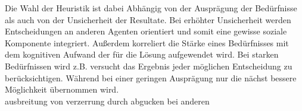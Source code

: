 Die Wahl der Heuristik ist dabei Abhängig von der Ausprägung der Bedürfnisse als auch von der Unsicherheit der Resultate.
Bei erhöhter Unsicherheit werden Entscheidungen an anderen Agenten orientiert und somit eine gewisse soziale Komponente integriert.
Außerdem korreliert die Stärke eines Bedürfnisses mit dem kognitiven Aufwand der für die Lösung aufgewendet wird.
Bei starken Bedürfnissen wird z.B. versucht das Ergebnis jeder möglichen Entscheidung zu berücksichtigen.
Während bei einer geringen Ausprägung nur die nächst bessere Möglichkeit übernommen wird.
\\
ausbreitung von verzerrung durch abgucken bei anderen\\


